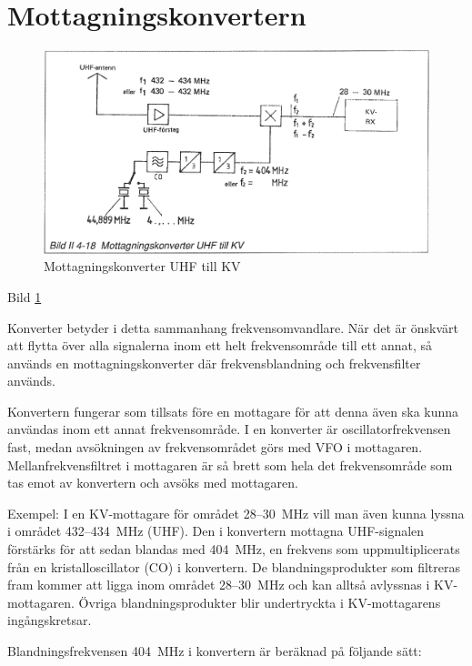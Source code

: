 \section{Mottagningskonvertern}

\begin{figure}
  \includegraphics[width=\textwidth]{images/bild_2_4-18}
  \caption{Mottagningskonverter UHF till KV}
  \label{fig:bildII4-18}
\end{figure}

Bild \ref{fig:bildII4-18}

Konverter betyder i detta sammanhang frekvensomvandlare. När det är
önskvärt att flytta över alla signalerna inom ett helt frekvensområde
till ett annat, så används en mottagningskonverter där
frekvensblandning och frekvensfilter används.

Konvertern fungerar som tillsats före en mottagare för att denna även
ska kunna användas inom ett annat frekvensområde. I en konverter är
oscillatorfrekvensen fast, medan avsökningen av frekvensområdet görs
med VFO i mottagaren. Mellanfrekvensfiltret i mottagaren är så brett
som hela det frekvensområde som tas emot av konvertern och avsöks med
mottagaren.

Exempel: I en KV-mottagare för området 28--30~MHz vill man även kunna
lyssna i området 432--434~MHz (UHF). Den i konvertern mottagna
UHF-signalen förstärks för att sedan blandas med 404~MHz, en frekvens
som uppmultiplicerats från en kristalloscillator (CO) i konvertern. De
blandningsprodukter som filtreras fram kommer att ligga inom området
28--30~MHz och kan alltså avlyssnas i KV-mottagaren. Övriga
blandningsprodukter blir undertryckta i KV-mottagarens ingångskretsar.

Blandningsfrekvensen 404~MHz i konvertern är beräknad på följande sätt:

